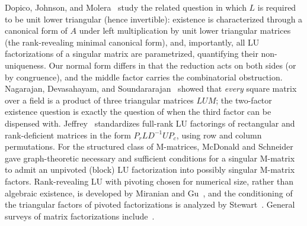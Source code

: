 \documentclass[preprint,12pt]{elsarticle}
\theoremstyle{plain}
\theoremstyle{nonumberplain}
\numberwithin{equation}{section}
\numberwithin{theorem}{section}
\begin{document}
Dopico, Johnson, and Molera~\cite{dopico_multiple_2006} study the related question in which $L$ is required to be unit lower triangular (hence invertible): existence is characterized through a canonical form of $A$ under left multiplication by unit lower triangular matrices (the rank-revealing minimal canonical form), and, importantly, all LU factorizations of a singular matrix are parametrized, quantifying their non-uniqueness.  Our normal form differs in that the reduction acts on both sides (or by congruence), and the middle factor carries the combinatorial obstruction. Nagarajan, Devasahayam, and Soundararajan~\cite{nagarajan_products_1999} showed that \emph{every} square matrix over a field is a product of three triangular matrices $LUM$; the two-factor existence question is exactly the question of when the third factor can be dispensed with. Jeffrey~\cite{jeffrey_lu_2010} standardizes full-rank LU factorings of rectangular and rank-deficient matrices in the form $P_r L D^{-1} U P_c$, using row and column permutations.  For the structured class of M-matrices, McDonald and Schneider~\cite{mcdonald_schneider_1998} gave graph-theoretic necessary and sufficient conditions for a singular M-matrix to admit an unpivoted (block) LU factorization into possibly singular M-matrix factors.  Rank-revealing LU with pivoting chosen for numerical size, rather than algebraic existence, is developed by Miranian and Gu~\cite{miranian_gu_2003}, and the conditioning of the triangular factors of pivoted factorizations is analyzed by Stewart~\cite{stewart_triangular_1997}.  General surveys of matrix factorizations include~\cite{lu_numerical_2021}.
\end{document}
